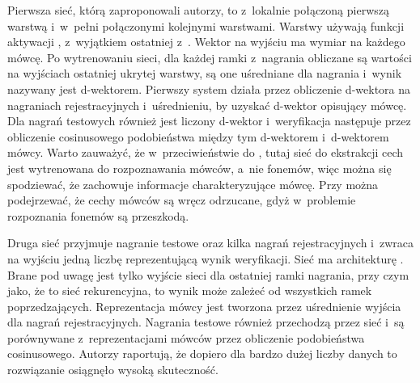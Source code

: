 Pierwsza sieć, którą zaproponowali autorzy, to  z~lokalnie połączoną pierwszą warstwą i~w~pełni połączonymi
kolejnymi warstwami. Warstwy używają funkcji aktywacji , z~wyjątkiem
ostatniej z~. Wektor na wyjściu ma wymiar na każdego mówcę. Po wytrenowaniu sieci, dla każdej
ramki z~nagrania obliczane są wartości na wyjściach ostatniej ukrytej warstwy,
są one uśredniane dla nagrania i~wynik nazywany jest d-wektorem. Pierwszy system działa przez obliczenie d-wektora
na nagraniach rejestracyjnych i~uśrednieniu, by uzyskać d-wektor opisujący mówcę.
Dla nagrań testowych również jest liczony d-wektor i~weryfikacja następuje przez obliczenie cosinusowego podobieństwa
między tym d-wektorem i~d-wektorem mówcy. Warto zauważyć, że w~przeciwieństwie
do , tutaj sieć do ekstrakcji cech jest wytrenowana do rozpoznawania mówców, a~nie
fonemów, więc można się spodziewać, że zachowuje informacje charakteryzujące mówcę.
Przy  można podejrzewać, że cechy mówców są wręcz odrzucane, gdyż w~problemie
rozpoznania fonemów są przeszkodą.

Druga sieć przyjmuje nagranie testowe oraz kilka nagrań rejestracyjnych i~zwraca na wyjściu jedną liczbę
reprezentującą wynik weryfikacji. Sieć ma architekturę . Brane pod uwagę
jest tylko wyjście sieci dla ostatniej ramki nagrania, przy czym jako, że to sieć rekurencyjna,
to wynik może zależeć od wszystkich ramek poprzedzających. Reprezentacja mówcy jest tworzona przez uśrednienie
wyjścia  dla nagrań rejestracyjnych. Nagrania testowe również przechodzą przez sieć i~są
porównywane z~reprezentacjami mówców przez obliczenie podobieństwa cosinusowego. Autorzy raportują, że dopiero
dla bardzo dużej liczby danych to rozwiązanie osiągnęło wysoką skuteczność.

